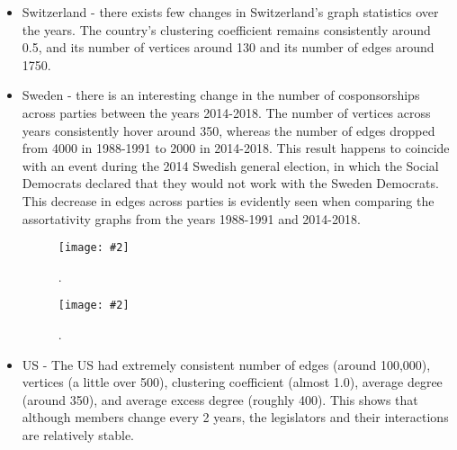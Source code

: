 \documentclass[12pt]{article}
\newcommand{\image}[5][0.6]{
  \begin{figure}[H]
    \centering
    \texttt{[image: \#2]}
    \caption[(details)]{\textbf{#4}. #5}
    \label{fig:#3}
  \end{figure}}
\begin{document}
\begin{itemize}
  \item Switzerland - there exists few changes in Switzerland's graph statistics over the years. The country's clustering coefficient remains consistently around 0.5, and its number of vertices around 130 and its number of edges around 1750. 
  \item Sweden - there is an interesting change in the number of cosponsorships across parties between the years 2014-2018. The number of vertices across years consistently hover around 350, whereas the number of edges dropped from 4000 in 1988-1991 to 2000 in 2014-2018. This result happens to coincide with an event during the 2014 Swedish general election, in which the Social Democrats declared that they would not work with the Sweden Democrats. This decrease in edges across parties is evidently seen when comparing the assortativity graphs from the years 1988-1991 and 2014-2018.
  \image[0.3]{../plots/graph/sweden/assortativity/assortativity_net_se1988-1991.pdf}{}{}{}
  \image[0.3]{../plots/graph/sweden/assortativity/assortativity_net_se2014-2018.pdf}{}{}{}
  \item US - The US had extremely consistent number of edges (around 100,000), vertices (a little over 500), clustering coefficient (almost 1.0), average degree (around 350), and average excess degree (roughly 400). This shows that although members change every 2 years, the legislators and their interactions are relatively stable. 
\end{itemize}
\end{document}
